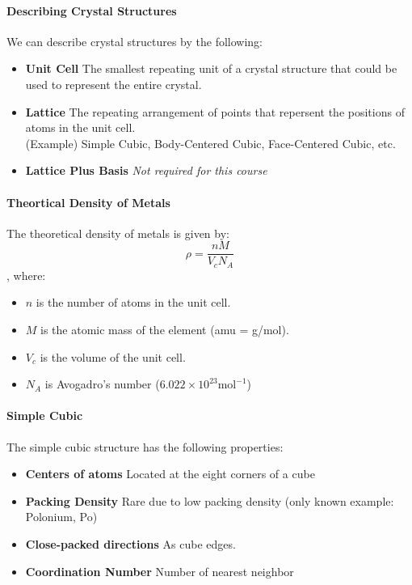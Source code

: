 \documentclass[11pt]{article}
\begin{document}
\paragraph{Describing Crystal Structures} We can describe crystal structures by the following:
\begin{itemize}
    \item \textbf{Unit Cell} The smallest repeating unit of a crystal structure that could be used to represent the entire crystal.
    \item \textbf{Lattice} The repeating arrangement of points that repersent the positions of atoms in the unit cell.\\
    (Example) Simple Cubic, Body-Centered Cubic, Face-Centered Cubic, etc.
    \item \textbf{Lattice Plus Basis} \textit{Not required for this course}
\end{itemize}
\paragraph{Theortical Density of Metals} The theoretical density of metals is given by:
\begin{equation}
    \rho = \frac{nM}{V_c N_A}
\end{equation}
, where:
\begin{itemize}
    \item $n$ is the number of atoms in the unit cell.
    \item $M$ is the atomic mass of the element (amu = g/mol).
    \item $V_c$ is the volume of the unit cell.
    \item $N_A$ is Avogadro's number ($6.022 \times 10^{23} \text{mol}^{-1}$)
\end{itemize}
\paragraph{Simple Cubic} The simple cubic structure has the following properties:
\begin{itemize}
    \item \textbf{Centers of atoms} Located at the eight corners of a cube
    \item \textbf{Packing Density} Rare due to low packing density (only known example: Polonium, Po)
    \item \textbf{Close-packed directions} As cube edges.
    \item \textbf{Coordination Number} Number of nearest neighbor
\end{itemize}

\end{document}
